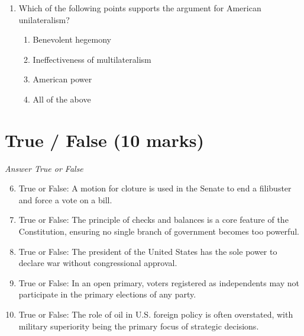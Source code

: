 \documentclass[12pt]{article}
\begin{document}
\begin{enumerate}[label=\arabic*.]
\begin{enumerate}[label=(\alph*)]
    \item The death penalty may only be imposed upon citizens.
    \item Under some circumstances, the death penalty may not violate the Eighth Amendment.
    \item Under some circumstances, the death penalty may violate the Third Amendment.
    \item States may execute any adult regardless of intellectual disability.
\end{enumerate}
\item Which of the following points supports the argument for American unilateralism?
\begin{enumerate}[label=(\alph*)]
    \item Benevolent hegemony
    \item Ineffectiveness of multilateralism
    \item American power
    \item All of the above
\end{enumerate}
\end{enumerate}

\section*{True / False (10 marks)}
\textit{Answer True or False}
\begin{enumerate}[label=\arabic*.]
\setcounter{enumi}{5}
\item True or False: A motion for cloture is used in the Senate to end a filibuster and force a vote on a bill.
\item True or False: The principle of checks and balances is a core feature of the Constitution, ensuring no single branch of government becomes too powerful.
\item True or False: The president of the United States has the sole power to declare war without congressional approval.
\item True or False: In an open primary, voters registered as independents may not participate in the primary elections of any party.
\item True or False: The role of oil in U.S. foreign policy is often overstated, with military superiority being the primary focus of strategic decisions.
\end{enumerate}
\end{document}
